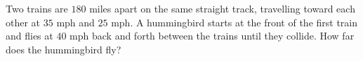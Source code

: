 Two trains are $180$ miles apart on the same straight track, travelling toward each other at $35$ mph and $25$ mph. A hummingbird starts at the front of the first train and flies at $40$ mph back and forth between the trains until they collide. How far does the hummingbird fly?
